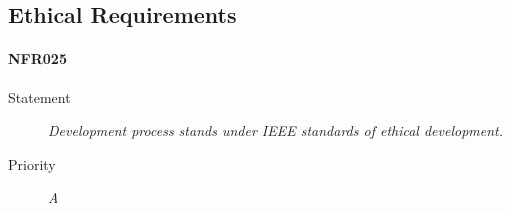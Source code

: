 \subsection{Ethical Requirements}
\paragraph{NFR025}
\begin{description}
\item[Statement] \textit{Development process stands under IEEE standards of
    ethical development.}
\item[Priority] \textit{A}
\end{description}